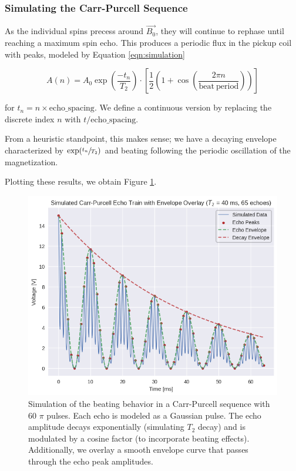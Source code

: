 \documentclass[
    floatfix,  %
    reprint,
    amsmath,
    amssymb,
    aps,
]{revtex4-2}
\begin{document}
\subsubsection{Simulating the Carr-Purcell Sequence}

As the individual spins precess around \(\vec{B_0}\), they will continue to rephase until reaching a maximum spin echo. This produces a periodic flux in the pickup coil with peaks, modeled by Equation \ref{eqn:simulation}

\begin{equation}\label{eqn:simulation}
    A(n) = A_0 \exp{\left( \frac{-t_n}{T_2} \right)} \cdot \left[ \frac{1}{2} \left(1 + \cos \left( \frac{2\pi n}{\mathrm{beat \ period}} \right)\right) \right]
\end{equation}

for $t_n = n \times \text{echo\_spacing}$. We define a continuous version by replacing the discrete index $n$ with $t/\text{echo\_spacing}$.

From a heuristic standpoint, this makes sense; we have a decaying envelope characterized by $\exp(\sfrac{t_n}{T_2})$ and beating following the periodic oscillation of the magnetization.

Plotting these results, we obtain Figure \ref{fig:simulation}.

\begin{figure}[htbp]
    \centering
    \includegraphics[width = 0.8\linewidth]{figs/purcell/simulation.png}
    \caption{Simulation of the beating behavior in a Carr-Purcell sequence with 60 $\pi$ pulses. Each echo is modeled as a Gaussian pulse. The echo amplitude decays exponentially (simulating $T_2$ decay) and is modulated by a cosine factor (to incorporate beating effects). Additionally, we overlay a smooth envelope curve that passes through the echo peak amplitudes.}\label{fig:simulation}
\end{figure}
\end{document}
